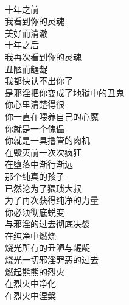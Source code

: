 \begin{poem}[在纯净中燃烧]
    \begin{multicols}{2}
        \begin{center}~\\
            十年之前 \\ 我看到你的灵魂 \\ 美好而清澈 \\ 十年之后 \\ 我再次看到你的灵魂 \\ 丑陋而龌龊 \\ 我都快认不出你了 \\ 是邪淫把你变成了地狱中的丑鬼 \\ 你心里清楚得很 \\ 你一直在喂养自己的心魔 \\ 你就是一个傀儡 \\ 你就是一具撸管的肉机 \\ 在毁灭前一次次疯狂 \\ 在堕落中渐行渐远 \\ 那个纯真的孩子 \\ 已然沦为了猥琐大叔 \\ 为了再次获得纯净的力量 \\ 你必须彻底蜕变 \\ 与邪淫的过去彻底决裂 \\ 在纯净中燃烧 \\ 烧光所有的丑陋与龌龊 \\ 烧光一切邪淫罪恶的过去 \\ 燃起熊熊的烈火 \\ 在烈火中净化 \\ 在烈火中涅槃
        \end{center}
    \end{multicols}
\end{poem}

